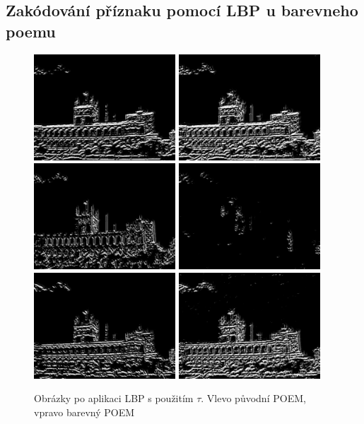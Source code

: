 \documentclass{report}
\begin{document}
\subsection{Zakódování příznaku pomocí LBP u barevneho poemu}
\begin{figure}[H]
	\centering
	\includegraphics[width=150pt]{./img/lbp0_tau.jpg}
	\includegraphics[width=150pt]{./img/lbp_3_0.jpg}
	\includegraphics[width=150pt]{./img/lbp1_tau.jpg}
	\includegraphics[width=150pt]{./img/lbp_3_1.jpg}
	\includegraphics[width=150pt]{./img/lbp2_tau.jpg}
	\includegraphics[width=150pt]{./img/lbp_3_2.jpg}
	\caption{Obrázky po aplikaci LBP s použitím $\tau$. Vlevo původní POEM, vpravo barevný POEM}
\end{figure}
\end{document}
